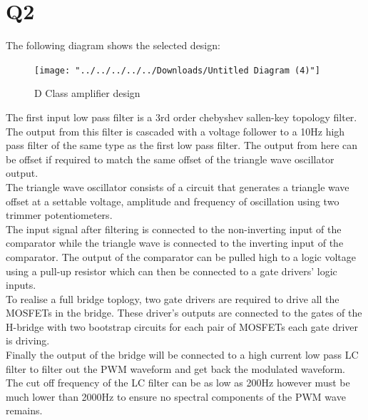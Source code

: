 \documentclass[]{article}
\begin{document}
	\section{Q2}
	The following diagram shows the selected design:
	\begin{figure}[H]
		\centering
		\texttt{[image: "../../../../../Downloads/Untitled Diagram (4)"]}
		\caption{D Class amplifier design}
		\label{fig:untitled-diagram-4}
	\end{figure}
\begin{multicols}{2}
	The first input low pass filter is a 3rd order chebyshev sallen-key topology filter. The output from this filter is cascaded with a voltage follower to a 10Hz high pass filter of the same type as the first low pass filter. The output from here can be offset if required to match the same offset of the triangle wave oscillator output.\\
	The triangle wave oscillator consists of a circuit that generates a triangle wave offset at a settable voltage, amplitude and frequency of oscillation using two trimmer potentiometers.\\
	The input signal after filtering is connected to the non-inverting input of the comparator while the triangle wave is connected to the inverting input of the comparator.
	The output of the comparator can be pulled high to a logic voltage using a pull-up resistor which can then be connected to a gate drivers' logic inputs.\\
	To realise a full bridge toplogy, two gate drivers are required to drive all the MOSFETs in the bridge. These driver's outputs are connected to the gates of the H-bridge with two bootstrap circuits for each pair of MOSFETs each gate driver is driving.\\
	Finally the output of the bridge will be connected to a high current low pass LC filter to filter out the PWM waveform and get back the modulated waveform. The cut off frequency of the LC filter can be as low as 200Hz however must be much lower than 2000Hz to ensure no spectral components of the PWM wave remains.\\

\end{multicols}
\end{document}
